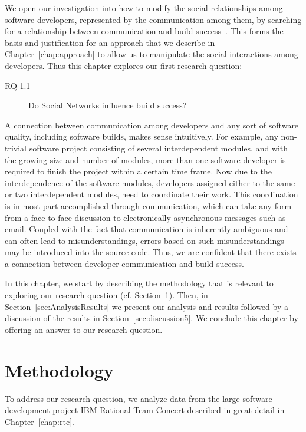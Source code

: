 \label{chap:soc-net}
We open our investigation into how to modify the social relationships among software developers, represented by the communication among them, by searching for a relationship between communication and build success~\cite{wolf:icse:2009}.
This forms the basis and justification for an approach that we describe in Chapter~\ref{chap:approach} to allow us to manipulate the social interactions among developers.
Thus this chapter explores our first research question:
\begin{description}
\item[RQ 1.1] Do Social Networks influence build success?
\end{description}

A connection between communication among developers and any sort of software quality, including software builds, makes sense intuitively.
For example, any non-trivial software project consisting of several interdependent modules, and with the growing size and number of modules, more than one software developer is required to finish the project within a certain time frame.
Now due to the interdependence of the software modules, developers assigned either to the same or two interdependent modules, need to coordinate their work.
This coordination is in most part accomplished through communication, which can take any form from a face-to-face discussion to electronically asynchronous messages such as email.
Coupled with the fact that communication is inherently ambiguous and can often lead to misunderstandings, errors based on such misunderstandings may be introduced into the source code.
Thus, we are confident that there exists  a connection between developer communication and build success.

In this chapter, we start by describing the methodology that is relevant to exploring our research question (cf. Section~\ref{sec:Methodology}).
Then, in Section~\ref{sec:AnalysisResults} we present our analysis and results followed by a discussion of the results in Section~\ref{sec:discussion5}.
We conclude this chapter by offering an answer to our research question.


\section{Methodology}
\label{sec:Methodology}
To address our research question, we analyze data from the large software
development project IBM Rational Team Concert described in great detail in Chapter~\ref{chap:rtc}.

